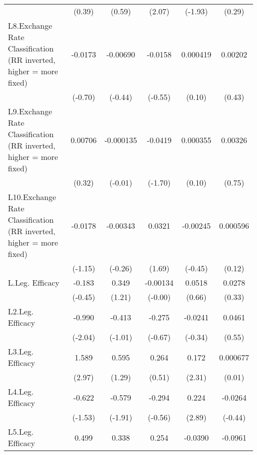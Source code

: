 {\begin{longtable}{l*{5}{c}}
                &   (0.39)         &   (0.59)         &   (2.07)         &  (-1.93)         &   (0.29)         \\
[1em]
L8.Exchange Rate Classification (RR inverted, higher = more fixed)&  -0.0173         & -0.00690         &  -0.0158         & 0.000419         &  0.00202         \\
                &  (-0.70)         &  (-0.44)         &  (-0.55)         &   (0.10)         &   (0.43)         \\
[1em]
L9.Exchange Rate Classification (RR inverted, higher = more fixed)&  0.00706         &-0.000135         &  -0.0419         & 0.000355         &  0.00326         \\
                &   (0.32)         &  (-0.01)         &  (-1.70)         &   (0.10)         &   (0.75)         \\
[1em]
L10.Exchange Rate Classification (RR inverted, higher = more fixed)&  -0.0178         & -0.00343         &   0.0321         & -0.00245         & 0.000596         \\
                &  (-1.15)         &  (-0.26)         &   (1.69)         &  (-0.45)         &   (0.12)         \\
[1em]
L.Leg. Efficacy &   -0.183         &    0.349         & -0.00134         &   0.0518         &   0.0278         \\
                &  (-0.45)         &   (1.21)         &  (-0.00)         &   (0.66)         &   (0.33)         \\
[1em]
L2.Leg. Efficacy&   -0.990\sym{*}  &   -0.413         &   -0.275         &  -0.0241         &   0.0461         \\
                &  (-2.04)         &  (-1.01)         &  (-0.67)         &  (-0.34)         &   (0.55)         \\
[1em]
L3.Leg. Efficacy&    1.589\sym{**} &    0.595         &    0.264         &    0.172\sym{*}  & 0.000677         \\
                &   (2.97)         &   (1.29)         &   (0.51)         &   (2.31)         &   (0.01)         \\
[1em]
L4.Leg. Efficacy&   -0.622         &   -0.579         &   -0.294         &    0.224\sym{**} &  -0.0264         \\
                &  (-1.53)         &  (-1.91)         &  (-0.56)         &   (2.89)         &  (-0.44)         \\
[1em]
L5.Leg. Efficacy&    0.499         &    0.338         &    0.254         &  -0.0390         &  -0.0961         \\

\end{longtable}}
